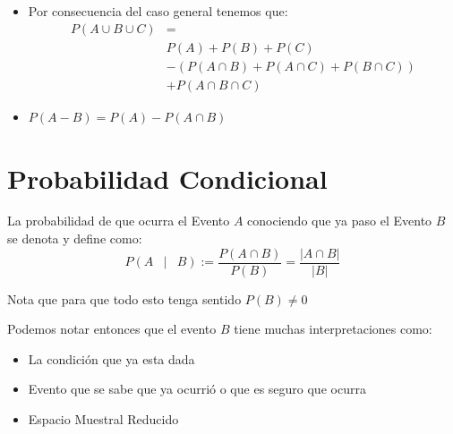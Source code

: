 \documentclass[12pt, fleqn]{report}                             %
\DeclareMathOperator \Space     {\quad}                         %
\DeclareMathOperator \MiniSpace {\;}                            %
\newcommand \Such           {\MiniSpace | \MiniSpace}           %
\theoremstyle{break}                                            %
\newcommand{\Wrap}[1]           {\left( #1 \right)}             %
\newcommand{\Mag}[1]    {\left| #1 \right|}                     %
\begin{document}
\begin{itemize}
                    \item Por consecuencia del caso general tenemos que: 
                        \begin{align*}
                            P(A \cup B \cup C) 
                                &=                                              \\
                                &P(A) + P(B) + P(C)                             \\
                                &-(P(A \cap B) + P(A \cap C) + P(B \cap C))     \\
                                &+ P(A \cap B \cap C)   
                        \end{align*}

                    \item
                        $P(A - B) = P(A) - P(A \cap B)$

                \end{itemize}

     

        \clearpage
        \section{Probabilidad Condicional}

            La probabilidad de que ocurra el Evento $A$ conociendo que ya paso
            el Evento $B$ se denota y define como:
            \begin{equation*}
                P \Wrap{ A \Such B}
                    := \frac{P(A \cap B)}{P(B)}
                    = \frac{\Mag{A \cap B}}{\Mag{B}}
            \end{equation*}

            Nota que para que todo esto tenga sentido $P(B) \neq 0$

            Podemos notar entonces que el evento $B$ tiene muchas interpretaciones
            como:
            \begin{itemize}
                \item La condición que ya esta dada
                \item Evento que se sabe que ya ocurrió o que es seguro que ocurra
                \item Espacio Muestral Reducido
            \end{itemize}
\end{document}
